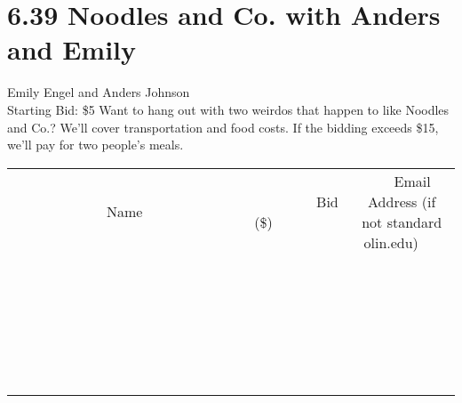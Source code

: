 \documentclass[11pt]{article}
\begin{document}
\section*{6.39 Noodles and Co. with Anders and Emily}
Emily Engel and Anders Johnson
\\
Starting Bid: \$5
\newline
Want to hang out with two weirdos that happen to like Noodles and Co.? We'll cover transportation and food costs. If the bidding exceeds \$15, we'll pay for two people's meals.
\\[6ex]
\begin{tabular}{c c c}
~~~~~~~~~~~~~Name~~~~~~~~~~~~~ & ~~~~~~~~~Bid (\$)~~~~~~~~~  & ~~~Email Address (if not standard olin.edu)~~~\\
 & & \\
\hline
 & & \\
\hline
 & & \\
\hline
 & & \\
\hline
 & & \\
\hline
 & & \\
\hline
 & & \\
\hline
 & & \\
\hline
 & & \\
\hline
 & & \\
\hline
 & & \\
\hline
 & & \\
\hline
 & & \\
\hline
 & & \\
\hline
 & & \\
\hline
 & & \\
\hline
 & & \\
\hline
 & & \\
\hline
 & & \\
\hline
 & & \\
\hline
 & & \\
\hline
 & & \\
\hline
 & & \\
\hline
 & & \\
\hline
 & & \\
\hline
 & & \\
\hline
\end{tabular}
\newpage
\end{document}
